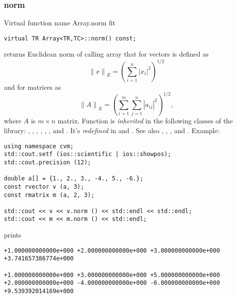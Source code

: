 \subsubsection{norm}
Virtual function%
\pdfdest name {Array.norm} fit
\begin{verbatim}
virtual TR Array<TR,TC>::norm() const;
\end{verbatim}
returns Euclidean norm of calling array that for vectors is defined as
\begin{equation*}
{\|x\|}_E=\left(\sum_{i=1}^{n} |x_i|^2\right)^{1/2}
\end{equation*}
and for matrices as
\begin{equation*}
{\|A\|}_E=\left(\sum_{i=1}^{m}\sum_{j=1}^{n} |a_{ij}|^2\right)^{1/2},
\end{equation*}
where $A$ is $m\times n$ matrix.
Function is \emph{inherited}
in the following classes of the library:
,   ,
,   ,
, ,
 and .
It's \emph{redefined} in
 and .
See also ,
,
,
 and
.
Example:
\begin{Verbatim}
using namespace cvm;
std::cout.setf (ios::scientific | ios::showpos);
std::cout.precision (12);

double a[] = {1., 2., 3., -4., 5., -6.};
const rvector v (a, 3);
const rmatrix m (a, 2, 3);

std::cout << v << v.norm () << std::endl << std::endl;
std::cout << m << m.norm () << std::endl;
\end{Verbatim}
prints
\begin{Verbatim}
+1.000000000000e+000 +2.000000000000e+000 +3.000000000000e+000
+3.741657386774e+000

+1.000000000000e+000 +3.000000000000e+000 +5.000000000000e+000
+2.000000000000e+000 -4.000000000000e+000 -6.000000000000e+000
+9.539392014169e+000
\end{Verbatim}
\newpage


